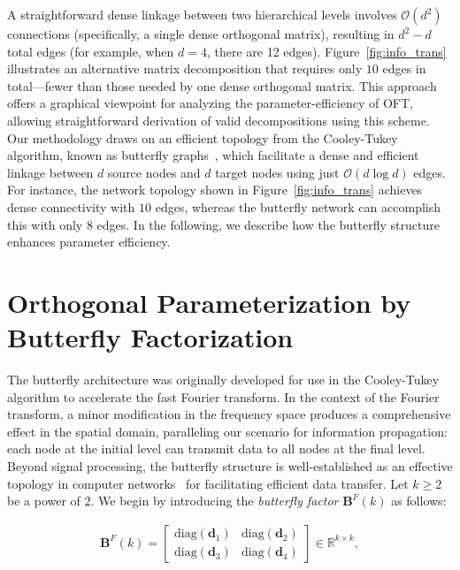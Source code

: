 A straightforward dense linkage between two hierarchical levels involves $\mathcal{O}(d^2)$ connections (specifically, a single dense orthogonal matrix), resulting in $d^2-d$ total edges (for example, when $d=4$, there are 12 edges). Figure~\ref{fig:info_trans} illustrates an alternative matrix decomposition that requires only $10$ edges in total—fewer than those needed by one dense orthogonal matrix. This approach offers a graphical viewpoint for analyzing the parameter-efficiency of OFT, allowing straightforward derivation of valid decompositions using this scheme. Our methodology draws on an efficient topology from the Cooley-Tukey algorithm, known as butterfly graphs~\cite{cooley1965algorithm}, which facilitate a dense and efficient linkage between $d$ source nodes and $d$ target nodes using just $\mathcal{O}(d\log d)$ edges. For instance, the network topology shown in Figure~\ref{fig:info_trans} achieves dense connectivity with $10$ edges, whereas the butterfly network can accomplish this with only $8$ edges. In the following, we describe how the butterfly structure enhances parameter efficiency.

\section{Orthogonal Parameterization by Butterfly Factorization}

The butterfly architecture was originally developed for use in the Cooley-Tukey algorithm to accelerate the fast Fourier transform. In the context of the Fourier transform, a minor modification in the frequency space produces a comprehensive effect in the spatial domain, paralleling our scenario for information propagation: each node at the initial level can transmit data to all nodes at the final level. Beyond signal processing, the butterfly structure is well-established as an effective topology in computer networks~\cite{solihin2015fundamentals,li2011linear} for facilitating efficient data transfer. Let $k \geq 2$ be a power of $2$. We begin by introducing the \emph{butterfly factor} $\bm{B}^F(k)$ as follows:

\begin{equation}\label{eq:but_factor}
\begin{aligned}
    \bm{B}^F(k)=\begin{bmatrix}
    \text{diag}(\bm{d}_1) & \text{diag}(\bm{d}_2) \\
    \text{diag}(\bm{d}_3) & \text{diag}(\bm{d}_4)
    \end{bmatrix}\in\mathbb{R}^{k\times k},
\end{aligned}
\end{equation}

